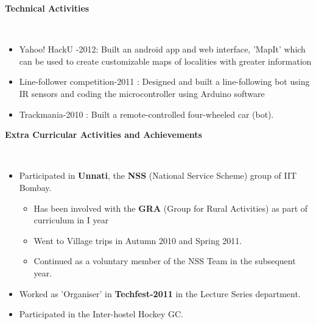 \documentclass[a4paper,11pt]{article}
\newcommand{\isep}{-2 pt}
\newcommand{\lsep}{-0.5cm}
\newcommand{\resheading}[1]{{\small \colorbox{mygrey}{\begin{minipage}{0.975\textwidth}{\textbf{#1 \vphantom{p\^{E}}}}\end{minipage}}}}
\begin{document}
\resheading{\textbf{\large Technical Activities}}\\[\lsep]
\begin{itemize}
 \begin{comment}
 \item Trackmania-2010
 	\begin{itemize}
 		\item Built a remote-controlled four-wheeled car (bot). 
 		\item Designed the circuit and soldered it. 
 	\end{itemize}
 \item Participated in Line-follower competition-2011.
 	\begin{itemize}
 		\item Designed and built a line-following bot.
 		\item Used IR sensors and Coded the microcontroller using Arduino software.
	\end{itemize}
 \end{comment}
 \item Yahoo! HackU -2012: Built an android app and web interface, 'MapIt' which can be used to create customizable maps of localities with greater information\\[-0.7cm]
 \item Line-follower competition-2011 : Designed and built a line-following bot using IR sensors and coding the microcontroller using Arduino software\\[-0.7cm]
\item Trackmania-2010 : Built a remote-controlled four-wheeled car (bot).
\end{itemize}

\resheading{\textbf{\large Extra Curricular Activities and Achievements}}\\[\lsep]
\begin{itemize}\itemsep \isep
  \item Participated in \textbf{Unnati}, the \textbf{NSS} (National Service Scheme) group of IIT Bombay.
	\begin{itemize} 
	 \item Has been involved with the \textbf{GRA} (Group for Rural Activities) as part of curriculum in I year\\[-0.6cm]
	 \item Went to Village trips in Autumn 2010 and Spring 2011.\\[-0.6cm]
	 \item Continued as a voluntary member of the NSS Team in the subsequent year.
	  \end{itemize}
  \item Worked as 'Organiser' in \textbf{Techfest-2011} in the Lecture Series department. \\[-0.6cm]
  \item Participated in the Inter-hostel Hockey GC. 
\end{itemize}
	
\end{document}
